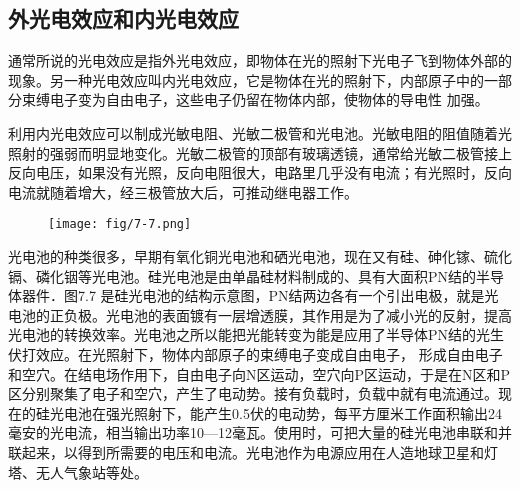 \subsection{外光电效应和内光电效应}

通常所说的光电效应是指外光电效应，即物体在光的照射下光电子飞到物体外部的现象。另一种光电效应叫内光电效应，它是物体在光的照射下，内部原子中的一部分束缚电子变为自由电子，这些电子仍留在物体内部，使物体的导电性
加强。

利用内光电效应可以制成光敏电阻、光敏二极管和光电池。光敏电阻的阻值随着光照射的强弱而明显地变化。光敏二极管的顶部有玻璃透镜，通常给光敏二极管接上反向电压，如果没有光照，反向电阻很大，电路里几乎没有电流；有光照时，反向电流就随着增大，经三极管放大后，可推动继电器工作。

\begin{figure}[htp]
    \centering
\texttt{[image: fig/7-7.png]}
    \caption{}
\end{figure}

光电池的种类很多，早期有氧化铜光电池和硒光电池，现在又有硅、砷化镓、硫化镉、磷化铟等光电池。硅光电池是由单晶硅材料制成的、具有大面积PN结的半导体器件．图7.7
是硅光电池的结构示意图，PN结两边各有一个引出电极，就是光电池的正负极。光电池的表面镀有一层增透膜，其作用是为了减小光的反射，提高光电池的转换效率。光电池之所以能把光能转变为能是应用了半导体PN结的光生伏打效应。在光照射下，物体内部原子的束缚电子变成自由电子，
形成自由电子和空穴。在结电场作用下，自由电子向N区运动，空穴向P区运动，于是在N区和P区分别聚集了电子和空穴，产生了电动势。接有负载时，负载中就有电流通过。现在的硅光电池在强光照射下，能产生0.5伏的电动势，每平方厘米工作面积输出24毫安的光电流，相当输出功率10—12毫瓦。使用时，可把大量的硅光电池串联和并联起来，以得到所需要的电压和电流。光电池作为电源应用在人造地球卫星和灯塔、无人气象站等处。









